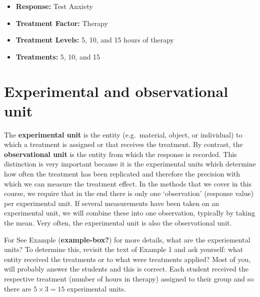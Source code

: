 \documentclass[
  letterpaper,
  DIV=11,
  numbers=noendperiod,
  oneside]{scrreprt}
\providecommand{\tightlist}{%
  \setlength{\itemsep}{0pt}\setlength{\parskip}{0pt}}\usepackage{longtable,booktabs,array}
\begin{document}
\begin{itemize}
\tightlist
\item
  \textbf{Response:} Test Anxiety\\
\item
  \textbf{Treatment Factor:} Therapy\\
\item
  \textbf{Treatment Levels:} 5, 10, and 15 hours of therapy\\
\item
  \textbf{Treatments:} 5, 10, and 15
\end{itemize}

\section*{\texorpdfstring{\textbf{Experimental and observational
unit}}{Experimental and observational unit}}\label{experimental-and-observational-unit}


The \textbf{experimental unit} is the entity (e.g.~material, object, or
individual) to which a treatment is assigned or that receives the
treatment. By contrast, the \textbf{observational unit} is the entity
from which the response is recorded. This distinction is very important
because it is the experimental units which determine how often the
treatment has been replicated and therefore the precision with which we
can measure the treatment effect. In the methods that we cover in this
course, we require that in the end there is only one `observation'
(response value) per experimental unit. If several measurements have
been taken on an experimental unit, we will combine these into one
observation, typically by taking the mean. Very often, the experimental
unit is also the observational unit.

For See Example
(\textbf{example-box?})
for more details, what are the experiemental units? To determine this,
revisit the text of Example 1 and ask yourself: what entity received the
treatments or to what were treatments applied? Most of you, will
probably answer the students and this is correct. Each student received
the respective treatment (number of hours in therapy) assigned to their
group and so there are \(5 \times 3 = 15\) experimental units.
\end{document}
